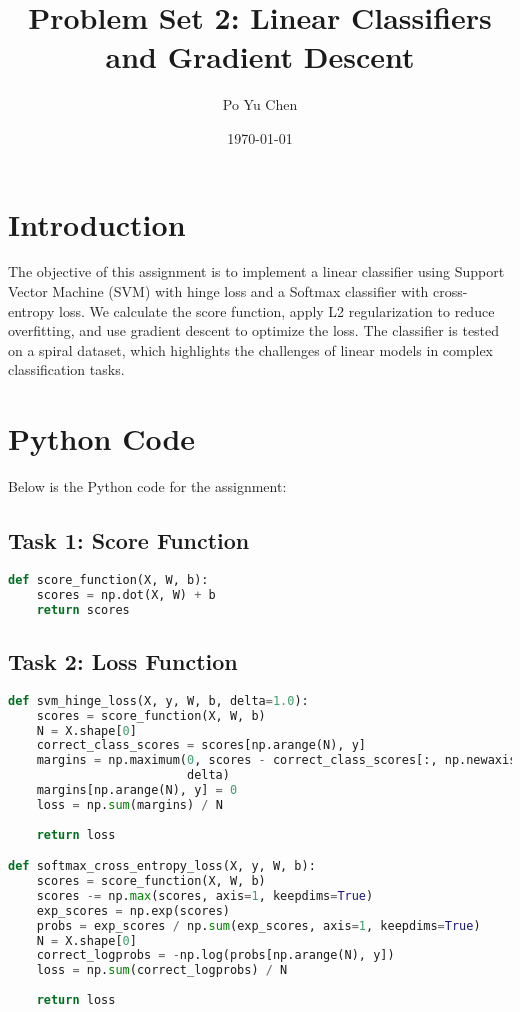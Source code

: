 \documentclass{article}
\title{Problem Set 2: Linear Classifiers and Gradient Descent}
\author{Po Yu Chen}
\date{\today}
\begin{document}
\maketitle

\section{Introduction}
The objective of this assignment is to implement a linear classifier using Support Vector Machine (SVM) with hinge loss and a Softmax classifier with cross-entropy loss. We calculate the score function, apply L2 regularization to reduce overfitting, and use gradient descent to optimize the loss. The classifier is tested on a spiral dataset, which highlights the challenges of linear models in complex classification tasks.

\section{Python Code}
Below is the Python code for the assignment:

\subsection{Task 1: Score Function}
\begin{lstlisting}[language=Python]
def score_function(X, W, b):
    scores = np.dot(X, W) + b
    return scores
\end{lstlisting}

\subsection{Task 2: Loss Function}
\begin{lstlisting}[language=Python]
def svm_hinge_loss(X, y, W, b, delta=1.0):
    scores = score_function(X, W, b)
    N = X.shape[0]
    correct_class_scores = scores[np.arange(N), y]
    margins = np.maximum(0, scores - correct_class_scores[:, np.newaxis] +
                         delta)
    margins[np.arange(N), y] = 0  
    loss = np.sum(margins) / N
    
    return loss

def softmax_cross_entropy_loss(X, y, W, b):
    scores = score_function(X, W, b)
    scores -= np.max(scores, axis=1, keepdims=True)
    exp_scores = np.exp(scores)
    probs = exp_scores / np.sum(exp_scores, axis=1, keepdims=True)
    N = X.shape[0]
    correct_logprobs = -np.log(probs[np.arange(N), y])
    loss = np.sum(correct_logprobs) / N
    
    return loss
\end{lstlisting}
\end{document}
